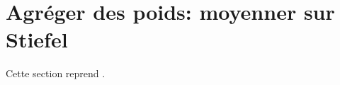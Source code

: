 

\section{Agréger des poids: moyenner sur Stiefel}
\label{sec:spdnet-federe}

\begin{contributions}
  Cette section reprend .
\end{contributions}


